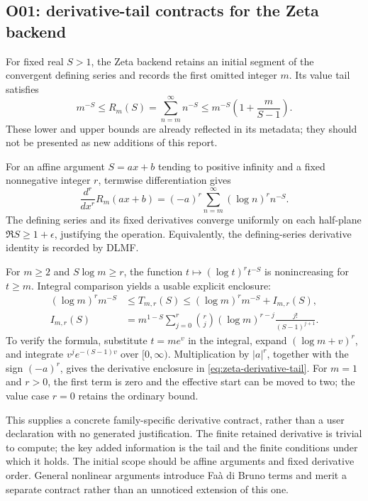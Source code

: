\documentclass[11pt,a4paper]{article}
\begin{document}
\subsection{O01: derivative-tail contracts for the Zeta backend}
For fixed real \(S>1\), the Zeta backend retains an initial segment of the convergent defining series and records the first omitted integer \(m\). Its value tail satisfies
\[
 m^{-S}\le R_m(S)=\sum_{n=m}^{\infty}n^{-S}
 \le m^{-S}\left(1+\frac{m}{S-1}\right).
\]
These lower and upper bounds are already reflected in its metadata; they should not be presented as new additions of this report.\cite{dirichlet,dlmf-zeta}

For an affine argument \(S=ax+b\) tending to positive infinity and a fixed nonnegative integer \(r\), termwise differentiation gives
\begin{equation}
 \frac{d^r}{dx^r}R_m(ax+b)
 =(-a)^r\sum_{n=m}^{\infty}(\log n)^r n^{-S}.
 \label{eq:zeta-derivative-tail}
\end{equation}
The defining series and its fixed derivatives converge uniformly on each half-plane \(\Re S\ge1+\epsilon\), justifying the operation. Equivalently, the defining-series derivative identity is recorded by DLMF.\cite{dlmf-zeta}

For \(m\ge2\) and \(S\log m\ge r\), the function
\(t\mapsto(\log t)^r t^{-S}\) is nonincreasing for \(t\ge m\). Integral comparison yields a usable explicit enclosure:
\begin{align}
 (\log m)^r m^{-S}
 &\le T_{m,r}(S)\le (\log m)^r m^{-S}+I_{m,r}(S),\\
 I_{m,r}(S)
 &=m^{1-S}\sum_{j=0}^{r}
   \binom rj (\log m)^{r-j}\frac{j!}{(S-1)^{j+1}}.
 \label{eq:zeta-integral}
\end{align}
To verify the formula, substitute \(t=me^v\) in the integral, expand \((\log m+v)^r\), and integrate \(v^je^{-(S-1)v}\) over \([0,\infty)\). Multiplication by \(|a|^r\), together with the sign \((-a)^r\), gives the derivative enclosure in \eqref{eq:zeta-derivative-tail}. For \(m=1\) and \(r>0\), the first term is zero and the effective start can be moved to two; the value case \(r=0\) retains the ordinary bound.

This supplies a concrete family-specific derivative contract, rather than a user declaration with no generated justification. The finite retained derivative is trivial to compute; the key added information is the tail and the finite conditions under which it holds. The initial scope should be affine arguments and fixed derivative order. General nonlinear arguments introduce Fa\`a di Bruno terms and merit a separate contract rather than an unnoticed extension of this one.
\end{document}
